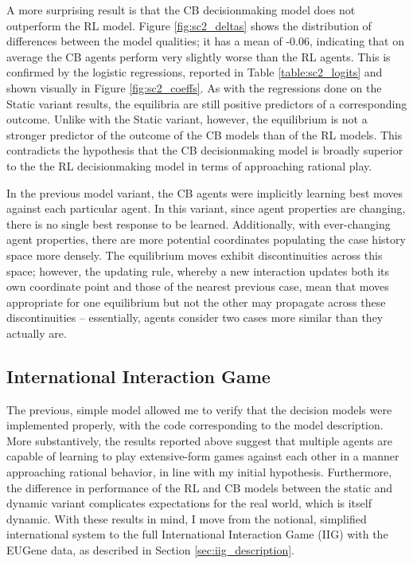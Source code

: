 A more surprising result is that the CB decisionmaking model does not outperform the RL model.  Figure \ref{fig:sc2_deltas} shows the distribution of differences between the model qualities; it has a mean of -0.06, indicating that on average the CB agents perform very slightly worse than the RL agents. This is confirmed by the logistic regressions, reported in Table \ref{table:sc2_logits} and shown visually in Figure \ref{fig:sc2_coeffs}. As with the regressions done on the Static variant results, the equilibria are still positive predictors of a corresponding outcome. Unlike with the Static variant, however, the equilibrium is not a stronger predictor of the outcome of the CB models than of the RL models. This contradicts the hypothesis that the CB decisionmaking model is broadly superior to the the RL decisionmaking model in terms of approaching rational play.

In the previous model variant, the CB agents were implicitly learning best moves against each particular agent. In this variant, since agent properties are changing, there is no single best response to be learned. Additionally, with ever-changing agent properties, there are more potential coordinates populating the case history space more densely. The equilibrium moves exhibit discontinuities across this space; however, the updating rule, whereby a new interaction updates both its own coordinate point and those of the nearest previous case, mean that moves appropriate for one equilibrium but not the other may propagate across these discontinuities -- essentially, agents consider two cases more similar than they actually are. 

\subsection{International Interaction Game} \label{iig_results}

The previous, simple model allowed me to verify that the decision models were implemented properly, with the code corresponding to the model description. More substantively, the results reported above suggest that multiple agents are capable of learning to play extensive-form games against each other in a manner approaching rational behavior, in line with my initial hypothesis. Furthermore, the difference in performance of the RL and CB models between the static and dynamic variant complicates expectations for the real world, which is itself dynamic. With these results in mind, I move from the notional, simplified international system to the full International Interaction Game (IIG) with the EUGene data, as described in Section \ref{sec:iig_description}. 

